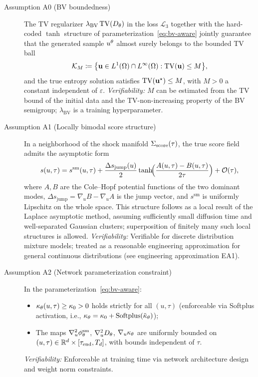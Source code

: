 \begin{description}
\item[Assumption A0 (BV boundedness)]\label{ass:A0}
The TV regularizer $\lambda_{\mathrm{BV}} \, \mathrm{TV}(D_{\theta})$ in the loss $\mathcal{L}_3$ together with the hard-coded $\tanh$ structure of parameterization~\eqref{eq:bv-aware} jointly guarantee that the generated sample $u^{\theta}$ almost surely belongs to the bounded TV ball
\begin{equation}
  \mathcal{K}_M \coloneqq \bigl\{ \mathbf{u} \in L^1(\Omega) \cap L^\infty(\Omega) : \mathrm{TV}(\mathbf{u}) \leq M \bigr\},
\end{equation}
and the true entropy solution satisfies $\mathrm{TV}(\mathbf{u}^{\star}) \leq M$, with $M > 0$ a constant independent of $\varepsilon$.
\emph{Verifiability:} $M$ can be estimated from the TV bound of the initial data and the TV-non-increasing property of the BV semigroup; $\lambda_{\mathrm{BV}}$ is a training hyperparameter.

\item[Assumption A1 (Locally bimodal score structure)]\label{ass:A1}
In a neighborhood of the shock manifold $\Sigma_{\mathrm{score}}(\tau)$, the true score field admits the asymptotic form
\begin{equation}
  s(u, \tau) = s^{\mathrm{sm}}(u, \tau) + \frac{\Delta s_{\mathrm{jump}}(u)}{2} \tanh\!\Bigl(\frac{A(u,\tau) - B(u,\tau)}{2\tau}\Bigr) + \mathcal{O}(\tau),
\end{equation}
where $A, B$ are the Cole--Hopf potential functions of the two dominant modes, $\Delta s_{\mathrm{jump}} = \nabla_u B - \nabla_u A$ is the jump vector, and $s^{\mathrm{sm}}$ is uniformly Lipschitz on the whole space.
This structure follows as a local result of the Laplace asymptotic method, assuming sufficiently small diffusion time and well-separated Gaussian clusters; superposition of finitely many such local structures is allowed.
\emph{Verifiability:} Verifiable for discrete distribution mixture models; treated as a reasonable engineering approximation for general continuous distributions (see engineering approximation EA1).

\item[Assumption A2 (Network parameterization constraint)]\label{ass:A2}
In the parameterization~\eqref{eq:bv-aware}:
\begin{itemize}
  \item $\kappa_{\theta}(u,\tau) \geq \kappa_0 > 0$ holds strictly for all $(u,\tau)$ (enforceable via Softplus activation, i.e., $\kappa_{\theta} = \kappa_0 + \mathrm{Softplus}(\tilde{\kappa}_\theta)$);
  \item The maps $\nabla_u^2 \phi^{\mathrm{sm}}_{\theta}$, $\nabla_u^2 D_{\theta}$, $\nabla_u \kappa_{\theta}$ are uniformly bounded on $(u,\tau) \in \mathbb{R}^d \times [\tau_{\mathrm{end}}, T_d]$, with bounds independent of $\tau$.
\end{itemize}
\emph{Verifiability:} Enforceable at training time via network architecture design and weight norm constraints.


\end{description}

